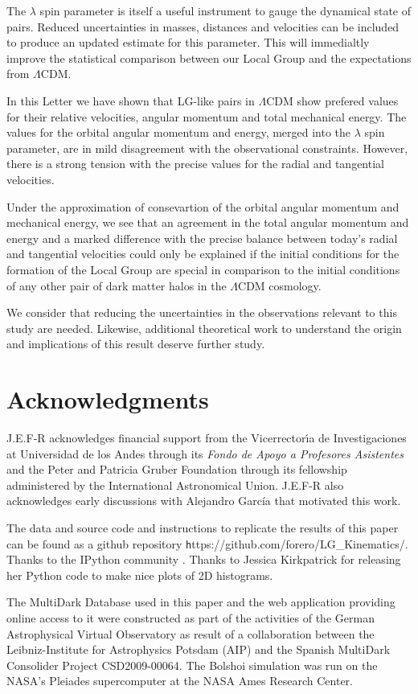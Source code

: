 \documentclass{emulateapj}
\begin{document}
The $\lambda$ spin parameter is itself a useful instrument to gauge the dynamical state of pairs. Reduced uncertainties in masses, distances and velocities can be included to produce an updated estimate for this parameter. This will immedialtly improve the statistical comparison between our Local Group and the expectations from $\Lambda$CDM.

In this Letter we have shown that LG-like pairs in $\Lambda$CDM show prefered values for their relative velocities, angular momentum and total mechanical energy. The values for the orbital angular momentum and energy, merged into the $\lambda$ spin parameter, are in mild disagreement with the observational constraints. However, there is a strong tension with the precise values for the radial and tangential velocities.

Under the approximation of consevartion of the orbital angular momentum and mechanical energy, we see that an agreement in the total angular momentum and energy and a marked difference with the precise balance between today's radial and tangential velocities could only be explained if the initial conditions for the formation of the Local Group are special in comparison to the initial conditions of any other pair of dark matter halos in the $\Lambda$CDM cosmology. 

We consider that reducing the uncertainties in the observations relevant to this study are needed. Likewise, additional theoretical work to understand the origin and implications of this result deserve further study.

\label{sec:conclusions}
\section*{Acknowledgments}  
J.E.F-R acknowledges financial support from the Vicerrector\'{\i}a de Investigaciones at Universidad de los Andes through its {\it Fondo de Apoyo a Profesores Asistentes} and the Peter and Patricia Gruber Foundation through its fellowship administered by the International Astronomical Union. J.E.F-R also acknowledges early discussions with Alejandro Garc\'ia that motivated this work.

The data and source code and instructions to replicate the results of this paper can be found as a github repository {\texttt https://github.com/forero/LG\_Kinematics/}. Thanks to the IPython community \citep{IPython}. Thanks to Jessica Kirkpatrick for releasing her Python code to make nice plots of 2D histograms. 

The MultiDark Database used in this paper and the web application providing online access to it were constructed as part of the activities of the German Astrophysical Virtual Observatory as result of a collaboration between the Leibniz-Institute for Astrophysics Potsdam (AIP) and the Spanish MultiDark Consolider Project CSD2009-00064. The Bolshoi simulation was run on the NASA's Pleiades supercomputer at the NASA Ames Research Center.



 
\end{document}
